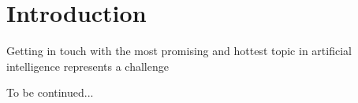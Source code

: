 \chapter{Introduction}
Getting in touch with the most promising and hottest topic in artificial intelligence represents a challenge

To be continued...